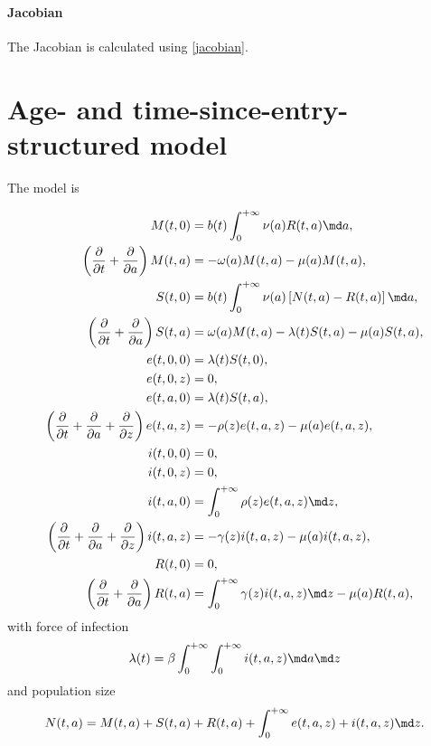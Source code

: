 \documentclass{jpmarticle}
\let\subequationsorig\subequations%
\let\endsubequationsorig\endsubequations%
\renewenvironment{subequations}{
  \subequationsorig
  \renewcommand{\theequation}{\theparentequation.\arabic{equation}}
}{
  \endsubequationsorig
}
\begin{document}
\paragraph{Jacobian}

The Jacobian is calculated using \eqref{jacobian}.


\section{Age- and time-since-entry-structured model}

The model is
\begin{subequations}
  \label{model_age_and_time_since_entry_structured}
  \begin{align}
    M(t, 0) &=
    b(t) \int_0^{+\infty} \nu(a) R(t, a) \md a,
    \\
    \left(\frac{\partial}{\partial t}
      + \frac{\partial}{\partial a}\right)
    M(t, a) &=
    - \omega(a) M(t, a) - \mu(a) M(t, a),
    \\
    S(t, 0) &=
    b(t) \int_0^{+\infty} \nu(a) \left[N(t, a) - R(t, a)\right] \md a,
    \\
    \left(\frac{\partial}{\partial t}
      + \frac{\partial}{\partial a}\right)
    S(t, a) &=
    \omega(a) M(t, a) - \lambda(t) S(t, a) - \mu(a) S(t, a),
    \\
    e(t, 0, 0) &=
    \lambda(t) S(t, 0),
    \\
    e(t, 0, z) &=
    0,
    \\
    e(t, a, 0) &=
    \lambda(t) S(t, a),
    \\
    \left(\frac{\partial}{\partial t}
      + \frac{\partial}{\partial a}
      + \frac{\partial}{\partial z}\right)
    e(t, a, z) &=
    - \rho(z) e(t, a, z) - \mu(a) e(t, a, z),
    \\
    i(t, 0, 0) &=
    0,
    \\
    i(t, 0, z) &=
    0,
    \\
    i(t, a, 0) &=
    \int_0^{+\infty} \rho(z) e(t, a, z) \md z,
    \\
    \left(\frac{\partial}{\partial t}
      + \frac{\partial}{\partial a}
      + \frac{\partial}{\partial z}\right)
    i(t, a, z) &=
    - \gamma(z) i(t, a, z) - \mu(a) i(t, a, z),
    \\
    R(t, 0) &=
    0,
    \\
    \left(\frac{\partial}{\partial t}
      + \frac{\partial}{\partial a}\right)
    R(t, a) &=
    \int_0^{+\infty} \gamma(z) i(t, a, z) \md z
    - \mu(a) R(t, a),
  \end{align}
  with force of infection
  \begin{equation}
    \lambda(t) =
    \beta
    \int_0^{+\infty} \int_0^{+\infty}
    i(t, a, z)
    \md a \md z
  \end{equation}
  and population size
  \begin{equation}
    N(t, a) =
    M(t, a) + S(t, a) + R(t, a)
    + \int_0^{+\infty} e(t, a, z) + i(t, a, z) \md z.
  \end{equation}
\end{subequations}
\end{document}
